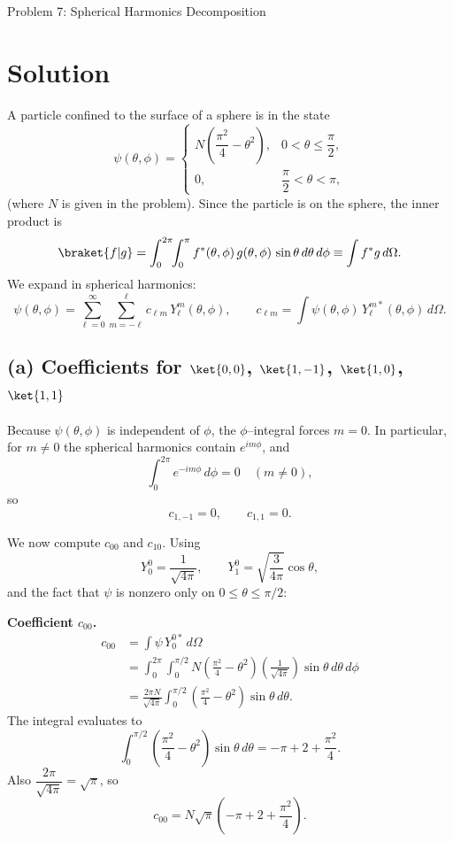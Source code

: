 \documentclass{article}
\begin{document}
\newpage

{\huge Problem 7: Spherical Harmonics Decomposition}

\section*{Solution}

A particle confined to the surface of a sphere is in the state
\[
\psi(\theta,\phi)=
\begin{cases}
N\left(\dfrac{\pi^2}{4}-\theta^2\right), & 0<\theta\le \dfrac{\pi}{2},\\[8pt]
0, & \dfrac{\pi}{2}<\theta<\pi,
\end{cases}
\]
(where $N$ is given in the problem).  Since the particle is on the sphere, the inner product is
\[
\braket{f|g}=\int_0^{2\pi}\!\!\int_0^\pi f^*(\theta,\phi)\,g(\theta,\phi)\,\sin\theta\,d\theta\,d\phi
\equiv \int f^* g\,d\Omega.
\]
We expand in spherical harmonics:
\[
\psi(\theta,\phi)=\sum_{\ell=0}^\infty\sum_{m=-\ell}^{\ell} c_{\ell m}\,Y_\ell^m(\theta,\phi),
\qquad
c_{\ell m}=\int \psi(\theta,\phi)\,Y_\ell^{m*}(\theta,\phi)\,d\Omega.
\]

\subsection*{(a) Coefficients for $\ket{0,0}$, $\ket{1,-1}$, $\ket{1,0}$, $\ket{1,1}$}

Because $\psi(\theta,\phi)$ is independent of $\phi$, the $\phi$--integral forces $m=0$.
In particular, for $m\neq 0$ the spherical harmonics contain $e^{im\phi}$, and
\[
\int_0^{2\pi} e^{-im\phi}\,d\phi = 0\quad (m\neq 0),
\]
so
\[
\boxed{c_{1,-1}=0,\qquad c_{1,1}=0.}
\]

We now compute $c_{00}$ and $c_{10}$.  Using
\[
Y_0^0=\frac{1}{\sqrt{4\pi}},\qquad
Y_1^0=\sqrt{\frac{3}{4\pi}}\cos\theta,
\]
and the fact that $\psi$ is nonzero only on $0\le\theta\le\pi/2$:

\medskip
\noindent\textbf{Coefficient $c_{00}$.}
\begin{align*}
c_{00}
&=\int \psi\,Y_0^{0*}\,d\Omega\\
&=\int_0^{2\pi}\!\!\int_0^{\pi/2}
N\left(\frac{\pi^2}{4}-\theta^2\right)\left(\frac{1}{\sqrt{4\pi}}\right)\sin\theta\,d\theta\,d\phi\\
&=\frac{2\pi N}{\sqrt{4\pi}}
\int_0^{\pi/2}\left(\frac{\pi^2}{4}-\theta^2\right)\sin\theta\,d\theta.
\end{align*}
The integral evaluates to
\[
\int_0^{\pi/2}\left(\frac{\pi^2}{4}-\theta^2\right)\sin\theta\,d\theta
=
-\pi+2+\frac{\pi^2}{4}.
\]
Also $\dfrac{2\pi}{\sqrt{4\pi}}=\sqrt{\pi}$, so
\[
\boxed{
c_{00}=N\sqrt{\pi}\left(-\pi+2+\frac{\pi^2}{4}\right).
}
\]
\end{document}
